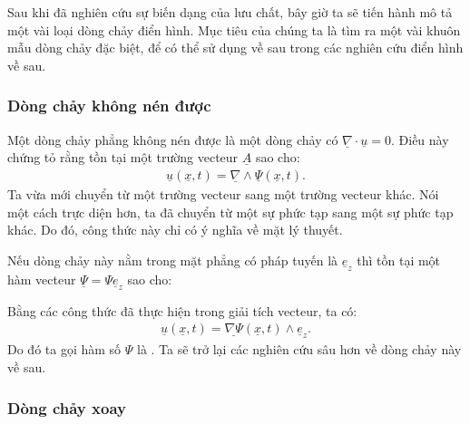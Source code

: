 \documentclass[../../../main.tex]{subfiles}
\begin{document}
	Sau khi đã nghiên cứu sự biến dạng của lưu chất, bây giờ ta sẽ tiến hành mô tả một vài loại dòng chảy điển hình. Mục tiêu của chúng ta là tìm ra một vài khuôn mẫu dòng chảy đặc biệt, để có thể sử dụng về sau trong các nghiên cứu điển hình về sau.
	\subsubsection{Dòng chảy không nén được}
		Một dòng chảy phẳng không nén được là một dòng chảy có $\underline{\nabla}\cdot\underline{u}=0$. Điều này chứng tỏ rằng tồn tại một trường vecteur $\underline{A}$ sao cho:
			\begin{align}
				\underline{u}\left(\underline{x},t\right)=\underline{\nabla}\wedge\underline{\Psi}\left(\underline{x},t\right).
			\end{align}
		Ta vừa mới chuyển từ một trường vecteur sang một trường vecteur khác. Nói một cách trực diện hơn, ta đã chuyển từ một sự phức tạp sang một sự phức tạp khác. Do đó, công thức này chỉ có ý nghĩa về mặt lý thuyết.

		Nếu dòng chảy này nằm trong mặt phẳng có pháp tuyến là $\underline{e}_z$ thì tồn tại một hàm vecteur $\underline{\Psi}=\Psi\underline{e}_z$ sao cho:
			
		Bằng các công thức đã thực hiện trong giải tích vecteur, ta có:
			\begin{align}
				\underline{u}\left(\underline{x},t\right)=\underline{\nabla\Psi}\left(\underline{x},t\right)\wedge\underline{e}_z.
			\end{align}
		Do đó ta gọi hàm số $\Psi$ là . Ta sẽ trở lại các nghiên cứu sâu hơn về dòng chảy này về sau.
	\subsubsection{Dòng chảy xoay}
		
\end{document}
